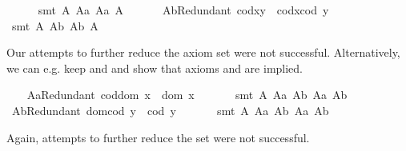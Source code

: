 \begin{isabellebody}
%
\isadelimproof
\ \ \ \ %
\endisadelimproof
%
\isatagproof
{}\isamarkupfalse%
\ {\isacharparenleft}smt\ A{}\ A{}a\ A{}a\ A{}{\isacharparenright}%
\endisatagproof
{\isafoldproof}%
%
\isadelimproof
\ \ \isanewline
%
\endisadelimproof
\ \ \isamarkupfalse%
\ A{}bRedundant{\isacharcolon}\ {\isachardoublequoteopen}cod{\isacharparenleft}x{\isasymcdot}y{\isacharparenright}\ {\isasymcong}\ cod{\isacharparenleft}x{\isasymcdot}{\isacharparenleft}cod\ y{\isacharparenright}{\isacharparenright}{\isachardoublequoteclose}\ \ \isanewline
%
\isadelimproof
\ \ \ \ %
\endisadelimproof
%
\isatagproof
{}\isamarkupfalse%
\ {\isacharparenleft}smt\ A{}\ A{}b\ A{}b\ A{}{\isacharparenright}%
\endisatagproof
{\isafoldproof}%
%
\isadelimproof
%
\endisadelimproof
%
\begin{isamarkuptext}%
Our attempts to further reduce the axiom set   were not successful.
Alternatively, we can e.g. keep  and  and show that axioms  
and  are implied.%
\end{isamarkuptext}\isamarkuptrue%
\ \ \isamarkupfalse%
\ A{}aRedundant{\isacharcolon}\ {\isachardoublequoteopen}cod{\isacharparenleft}dom\ x{\isacharparenright}\ {\isasymcong}\ dom\ x{\isachardoublequoteclose}\ \isanewline
%
\isadelimproof
\ \ \ \ %
\endisadelimproof
%
\isatagproof
{}\isamarkupfalse%
\ {\isacharparenleft}smt\ A{}\ A{}a\ A{}b\ A{}a\ A{}b{\isacharparenright}%
\endisatagproof
{\isafoldproof}%
%
\isadelimproof
\isanewline
%
\endisadelimproof
\ \ \isamarkupfalse%
\ A{}bRedundant{\isacharcolon}\ {\isachardoublequoteopen}dom{\isacharparenleft}cod\ y{\isacharparenright}\ {\isasymcong}\ cod\ y{\isachardoublequoteclose}\ \isanewline
%
\isadelimproof
\ \ \ \ %
\endisadelimproof
%
\isatagproof
{}\isamarkupfalse%
\ {\isacharparenleft}smt\ A{}\ A{}a\ A{}b\ A{}a\ A{}b{\isacharparenright}%
\endisatagproof
{\isafoldproof}%
%
\isadelimproof
%
\endisadelimproof
%
\begin{isamarkuptext}%
Again, attempts to further reduce the set  were not successful.

\end{isamarkuptext}
\end{isabellebody}
